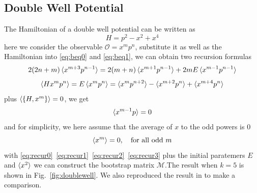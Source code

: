 \documentclass[aps,prl, preprint,amsmath, amssymb]{revtex4-2}
\begin{document}
\subsection{Double Well Potential}
The Hamiltonian of a double well potential can be written as
\begin{equation}
    H = p^2 - x^2 + x^4
\end{equation}
here we consider the observable $\mathcal{O} = x^m p^n$, substitute it as well as the Hamiltonian into \eqref{eq:beq0} and \eqref{eq:beq1}, we can obtain two recursion formulas
\begin{equation}
    2(2n + m)\braket{x^{m + 3} p^{n - 1}} = 2(m + n)\braket{x^{m + 1} p^{n - 1}} + 2mE\braket{x^{m - 1} p^{n - 1}} \label{eq:recur0}
\end{equation}
\begin{equation}
    \braket{Hx^m p^n} = E\braket{x^m p^n} = \braket{x^m p^{n + 2}} - \braket{x^{m + 2} p^n}\notag + \braket{x^{m + 4} p^n} \label{eq:recur1}
\end{equation}
plus $\braket{\{H, x^m\}} = 0$, we get
\begin{equation}
    \braket{x^{m - 1} p} = 0 \label{eq:recur2}
\end{equation}
and for simplicity, we here assume that the average of $x$ to the odd powers is $0$ 
\begin{equation}
    \braket{x^m} = 0,\ \ \ \text{for all odd}\ m \label{eq:recur3}
\end{equation}
with \eqref{eq:recur0}~\eqref{eq:recur1}~\eqref{eq:recur2}~\eqref{eq:recur3} plus the initial paratemers $E$ and $\braket{x^2}$ we can construct the bootstrap matrix $\bm{\mathcal{M}}$.The result when $k = 5$ is shown in Fig.~\ref{fig:doublewell}. We also reproduced the result in \cite{Nakayama_2022} to make a comparison.
\end{document}
